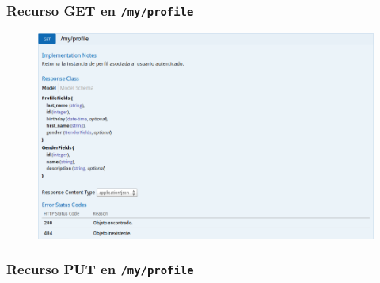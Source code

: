 \newpage


\subsubsection{Recurso GET en \texttt{/my/profile}}

\begin{figure}[h]
  \centering
  \includegraphics[width=\textwidth,height=.75\textheight,keepaspectratio]{img/especificacion_api/myProfileView_get}
  \label{myProfileView_get}
\end{figure}

\newpage


\subsubsection{Recurso PUT en \texttt{/my/profile}}

